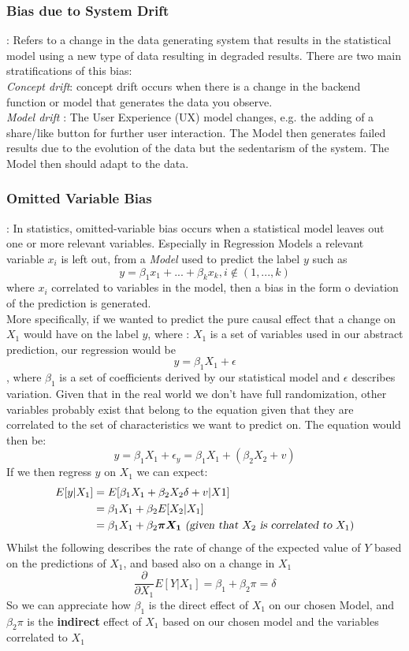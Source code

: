 \subsubsection{Bias due to System Drift}:
Refers to a change in the data generating system that results in the statistical model using a new type of data resulting in degraded results. There are two main stratifications of this bias:\\
\textsl{Concept drift}: concept drift occurs when there is a change in the backend function or model that generates the data you observe.\\
\textsl{Model drift} : The User Experience (UX) model changes, e.g. the adding of a share/like button for further user interaction.
The Model then generates failed results due to the evolution of the data but the sedentarism of the system. The Model then should adapt to the data.
\subsubsection{Omitted Variable Bias}:
In statistics, omitted-variable bias occurs when a statistical model leaves out one or more relevant variables. Especially in Regression Models a relevant variable $x_i$ is left out, from a \textsl{Model} used to predict the label $y$ such as $$y = \beta_1 x_1 + ... +\beta_k x_k, i\notin (1,...,k) $$ where $x_i$ correlated to variables in the model, then a bias in the form o deviation of the prediction is generated.\\
More specifically, if we wanted to predict the pure causal effect that a change on $X_1$ would have on the label $y$, where : $X_1$ is a set of variables used in our abstract prediction, our  regression would be $$y = \beta_1X_1 + \epsilon$$, where $\beta_1$ is a set of coefficients derived by our statistical model and $\epsilon$ describes variation. Given that in the real world we don't have full randomization, other variables probably exist that belong to the equation given that they are correlated to the set of characteristics we want to predict on. The equation would then be: $$y = \beta_1X_1 + \epsilon_y = \beta_1X_1 + (\beta_2X_2 + v)$$ If we then regress $y$ on $X_1$ we can expect:
\begin{align*}
  E[y|X_1] & = E[\beta_1X_1 + \beta_2X_2\delta+v | X1] \\
  &= \beta_1X_1 + \beta_2E[X_2|X_1] \\
  &= \beta_1X_1 + \beta_2\boldsymbol{\pi X_1}\textsl{ (given that } X_2 \textsl{ is correlated to } X_1)
\end{align*}
Whilst the following describes the rate of change of the expected value of $Y$ based on the predictions of $X_1$, and based also on a change in $X_1$
$$\frac{\partial}{\partial X_1}E[Y|X_1] = \beta_1 + \beta_2 \pi = \delta$$
So we can appreciate how $\beta_1$ is the direct effect of $X_1$ on our chosen Model, and $\beta_2 \pi$ is the \textbf{indirect} effect of $X_1$ based on our chosen model and the variables correlated to $X_1$
